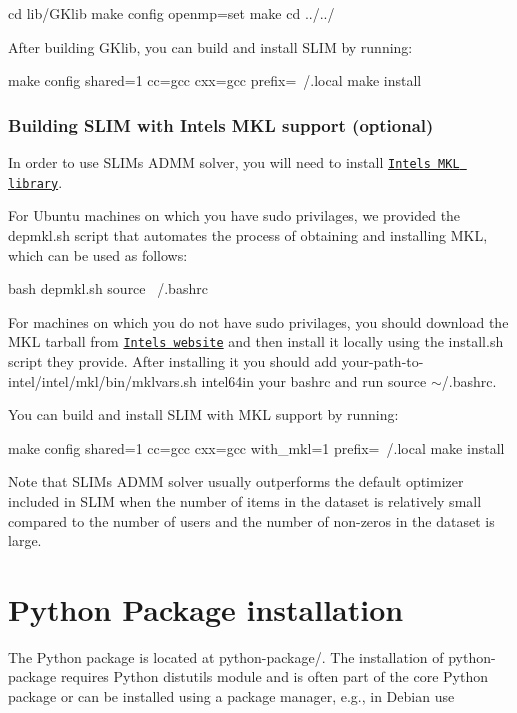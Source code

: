 \begin{DoxyVerb}cd lib/GKlib
make config openmp=set
make
cd ../../
\end{DoxyVerb}


After building G\+Klib, you can build and install S\+L\+IM by running\+:

\begin{DoxyVerb}make config shared=1 cc=gcc cxx=gcc prefix=~/.local
make install
\end{DoxyVerb}
\hypertarget{index_mkl_build}{}\subsubsection{Building S\+L\+I\+M with Intel\textquotesingle{}s M\+K\+L support (optional)}\label{index_mkl_build}
In order to use S\+L\+IM\textquotesingle{}s A\+D\+MM solver, you will need to install \href{https://software.intel.com/en-us/mkl}{\tt Intel\textquotesingle{}s M\+KL library}.

For Ubuntu machines on which you have {\ttfamily sudo} privilages, we provided the {\ttfamily depmkl.\+sh} script that automates the process of obtaining and installing M\+KL, which can be used as follows\+:

\begin{DoxyVerb}bash depmkl.sh
source ~/.bashrc 
\end{DoxyVerb}


For machines on which you do not have {\ttfamily sudo} privilages, you should download the M\+KL tarball from \href{https://software.intel.com/en-us/mkl}{\tt Intel\textquotesingle{}s website} and then install it locally using the {\ttfamily install.\+sh} script they provide. After installing it you should add {\ttfamily your-\/path-\/to-\/intel/intel/mkl/bin/mklvars.\+sh intel64}in your bashrc and run {\ttfamily source $\sim$/.bashrc}.

You can build and install S\+L\+IM with M\+KL support by running\+:

\begin{DoxyVerb}make config shared=1 cc=gcc cxx=gcc with_mkl=1 prefix=~/.local
make install
\end{DoxyVerb}


Note that S\+L\+IM\textquotesingle{}s A\+D\+MM solver usually outperforms the default optimizer included in S\+L\+IM when the number of items in the dataset is relatively small compared to the number of users and the number of non-\/zeros in the dataset is large.\hypertarget{index_pythonpackage}{}\section{Python Package installation}\label{index_pythonpackage}
The Python package is located at {\ttfamily python-\/package/}. The installation of python-\/package requires Python {\ttfamily distutils} module and is often part of the core Python package or can be installed using a package manager, e.\+g., in Debian use

